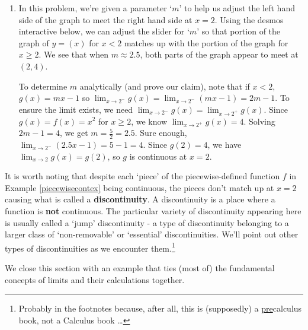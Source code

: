 \documentclass{ximera}
\begin{document}
\begin{example}
\begin{enumerate}
\begin{center}
\end{center}

\item In this problem, we're given a parameter `$m$' to help us adjust the left hand side of the graph to meet the right hand side at $x = 2$. Using the desmos interactive below, we can adjust the slider for `$m$' so that portion of the graph of $y = (x)$ for $x<2$ matches up with the portion of the graph for $x \geq 2$.  We see that when $m \approx 2.5$, both parts of the graph appear to meet at $(2,4)$.

\begin{center}
 \end{center}

To determine $m$ analytically (and prove our claim), note that  if $x<2$, $g(x) = mx-1$ so $\lim_{x \rightarrow 2^{-}} g(x) = \lim_{x \rightarrow 2^{-}} (mx-1) = 2m-1$. To ensure the limit exists, we need  $\lim_{x \rightarrow 2^{-}} g(x) = \lim_{x \rightarrow 2^{+}} g(x)$.  Since $g(x) = f(x) = x^2$ for $x \geq 2$, we know $\lim_{x \rightarrow 2^{+}} g(x) = 4$.  Solving  $2m-1 = 4$, we get $m = \frac{5}{2} = 2.5$.  Sure enough, $\lim_{x \rightarrow 2^{-}} (2.5x-1) = 5 - 1 = 4$.  Since $g(2) = 4$, we have $\lim_{x \rightarrow 2} g(x) = g(2)$, so $g$ is continuous at $x = 2$. 

\end{enumerate}
\end{example}

It is worth noting that despite each `piece' of the piecewise-defined function $f$ in Example \ref{piecewisecontex} being continuous, the pieces don't match up at $x=2$ causing what is called a \textbf{discontinuity}.   A discontinuity is a place where a function is \textbf{not} continuous.  The particular variety of discontinuity appearing here  is usually called a `jump' discontinuity - a type of discontinuity belonging to a larger class of  `non-removable' or `essential' discontinuities.  We'll point out other types of discontinuities as we encounter them.\footnote{Probably in the footnotes because, after all, this is (supposedly) a \underline{pre}calculus book, not a Calculus book \ldots} 

We close this section with an example that ties (most of) the fundamental concepts of limits and their calculations together.
\end{document}
